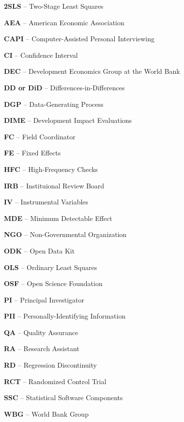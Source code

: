 \noindent\textbf{2SLS} -- Two-Stage Least Squares

\noindent\textbf{AEA} -- American Economic Association

\noindent\textbf{CAPI} -- Computer-Assisted Personal Interviewing

\noindent\textbf{CI} -- Confidence Interval

\noindent\textbf{DEC} -- Development Economics Group at the World Bank

\noindent\textbf{DD or DiD} -- Differences-in-Differences

\noindent\textbf{DGP} -- Data-Generating Process

\noindent\textbf{DIME} -- Development Impact Evaluations

\noindent\textbf{FC} -- Field Coordinator

\noindent\textbf{FE} -- Fixed Effects

\noindent\textbf{HFC} -- High-Frequency Checks

\noindent\textbf{IRB} -- Instituional Review Board

\noindent\textbf{IV} -- Instrumental Variables

\noindent\textbf{MDE} -- Minimum Detectable Effect

\noindent\textbf{NGO} -- Non-Governmental Organization

\noindent\textbf{ODK} -- Open Data Kit

\noindent\textbf{OLS} -- Ordinary Least Squares

\noindent\textbf{OSF} -- Open Science Foundation

\noindent\textbf{PI} -- Principal Investigator

\noindent\textbf{PII} -- Personally-Identifying Information

\noindent\textbf{QA} -- Quality Assurance

\noindent\textbf{RA} -- Research Assistant

\noindent\textbf{RD} -- Regression Discontinuity

\noindent\textbf{RCT} -- Randomized Control Trial

\noindent\textbf{SSC} -- Statistical Software Components

\noindent\textbf{WBG} -- World Bank Group

